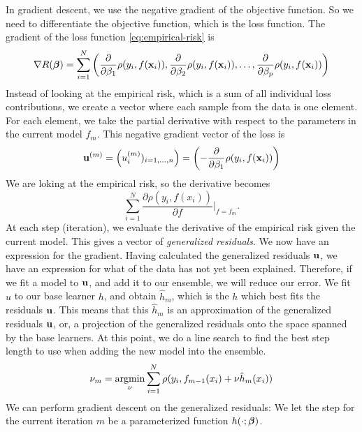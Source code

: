 In gradient descent, we use the negative gradient of the objective function. So we need to differentiate the objective function, which is the loss function. The gradient of the loss function \eqref{eq:empirical-risk} is
\begin{equation*}
    \nabla R(\boldsymbol{\beta})=\sum_{i=1}^N \left(\frac{\partial}{\partial \beta_1}\rho(y_i,f(\mathbf{x}_i)),\frac{\partial}{\partial \beta_2}\rho(y_i,f(\mathbf{x}_i)),\ldots,\frac{\partial}{\partial \beta_p}\rho(y_i,f(\mathbf{x}_i))\right)
\end{equation*}
Instead of looking at the empirical risk, which is a sum of all individual loss contributions, we create a vector where each sample from the data is one element. For each element, we take the partial derivative with respect to the parameters in the current model $f_m$. This negative gradient vector of the loss is
\begin{equation*}
    \mathbf{u}^{(m)}=\left(u_i^{(m)})_{i=1,\ldots,n}\right)=\left(-\frac{\partial}{\partial \beta_1}\rho(y_i,f(\mathbf{x}_i))\right)
\end{equation*}
We are loking at the empirical risk, so the derivative becomes
\begin{equation*}
    \sum_{i=1}^N\frac{\partial\rho(y_i,f(x_i))}{\partial f}|_{f=f_m}.
\end{equation*}
At each step (iteration), we evaluate the derivative of the empirical risk given the current model. This gives a vector of \textit{generalized residuals}.
We now have an expression for the gradient. %
Having calculated the generalized residuals $\mathbf{u}$, we have an expression for what of the data has not yet been explained. Therefore, if we fit a model to $\mathbf{u}$, and add it to our ensemble, we will reduce our error. We fit $u$ to our base learner $h$, and obtain $\hat{h}_m$, which is
the $h$ which best fits the residuals $\mathbf{u}$.
This means that this $\hat{h}_m$ is an approximation of the generalized residuals $\mathbf{u}$, or, a projection of the generalized residuals onto the space spanned by the base learners.
At this point, we do a line search to find the best step length to use when adding the new model into the ensemble.
\begin{equation*}
    \nu_m=\operatorname*{argmin}_\nu \sum_{i=1}^N \rho(y_i, f_{m-1}(x_i) + \nu \hat{h}_m(x_i))
\end{equation*}
We can perform gradient descent on the generalized residuals: We let the step for the current iteration $m$ be a parameterized function $h(\cdot;\boldsymbol{\beta})$.

